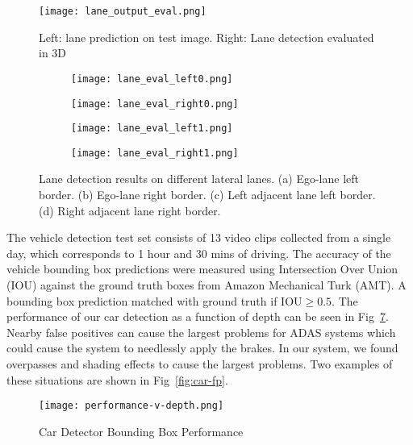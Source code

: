 \documentclass[journal]{IEEEtran}
\begin{document}
\begin{figure}[tb]
  \centering
    \texttt{[image: lane\_output\_eval.png]}
 \caption{Left: lane prediction on test image. Right: Lane detection evaluated in 3D}
 \label{fig:lane-output-eval}
\end{figure}

\begin{figure}[tb]
  \centering
    \begin{subfigure}[b]{1.6in}
      \texttt{[image: lane\_eval\_left0.png]}
      \caption{}
      \label{fig:lane-eval-left0}
    \end{subfigure}\begin{subfigure}[b]{1.6in}
      \texttt{[image: lane\_eval\_right0.png]}
      \caption{}
      \label{fig:lane-eval-right0}
    \end{subfigure}

    \begin{subfigure}[b]{1.6in}\texttt{[image: lane\_eval\_left1.png]}
      \caption{}
      \label{fig:lane-eval-left1}
    \end{subfigure}\begin{subfigure}[b]{1.6in}\texttt{[image: lane\_eval\_right1.png]}
      \caption{}
      \label{fig:lane-eval-right1}
    \end{subfigure}\caption{Lane detection results on different lateral lanes. (a) Ego-lane left border. (b) Ego-lane right border. (c) Left adjacent lane left border. (d) Right adjacent lane right border.}
 \label{fig:lane-eval-plot}
\end{figure}

The vehicle detection test set consists of 13 video clips collected from a single day, which corresponds to 1 hour and 30 mins of driving. The accuracy of the vehicle bounding box predictions were measured using Intersection Over Union (IOU) against the ground truth boxes from Amazon Mechanical Turk (AMT). A bounding box prediction matched with ground truth if IOU$\geq0.5$. The performance of our car detection as a function of depth can be seen in Fig~\ref{fig:car-bb-error}. Nearby false positives can cause the largest problems for ADAS systems which could cause the system to needlessly apply the brakes. In our system, we found overpasses and shading effects to cause the largest problems. Two examples of these situations are shown in Fig~\ref{fig:car-fp}.

\begin{figure}[tb]
  \centering
\texttt{[image: performance-v-depth.png]}
 \caption{Car Detector Bounding Box Performance}
 \label{fig:car-bb-error}
\end{figure}
\end{document}
